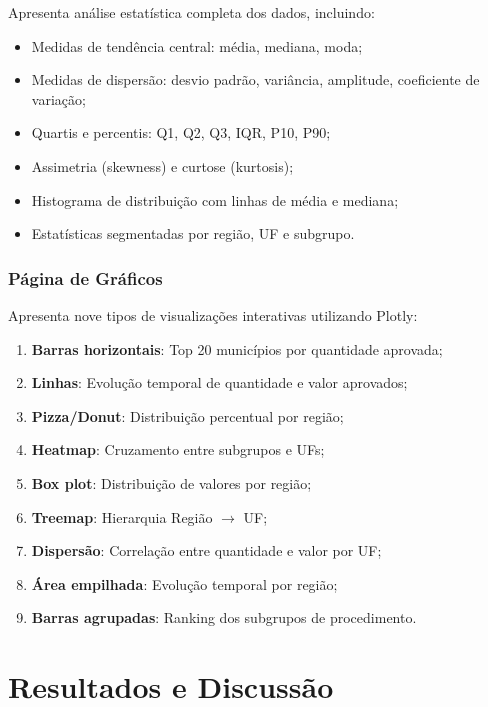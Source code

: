 \documentclass[
    12pt,
    oneside,
    a4paper,
    chapter=TITLE,
    section=TITLE
]{abntex2}
\begin{document}
Apresenta análise estatística completa dos dados, incluindo:

\begin{itemize}
    \item Medidas de tendência central: média, mediana, moda;
    \item Medidas de dispersão: desvio padrão, variância, amplitude, coeficiente de variação;
    \item Quartis e percentis: Q1, Q2, Q3, IQR, P10, P90;
    \item Assimetria (skewness) e curtose (kurtosis);
    \item Histograma de distribuição com linhas de média e mediana;
    \item Estatísticas segmentadas por região, UF e subgrupo.
\end{itemize}

\subsection{Página de Gráficos}

Apresenta nove tipos de visualizações interativas utilizando Plotly:

\begin{enumerate}
    \item \textbf{Barras horizontais}: Top 20 municípios por quantidade aprovada;
    \item \textbf{Linhas}: Evolução temporal de quantidade e valor aprovados;
    \item \textbf{Pizza/Donut}: Distribuição percentual por região;
    \item \textbf{Heatmap}: Cruzamento entre subgrupos e UFs;
    \item \textbf{Box plot}: Distribuição de valores por região;
    \item \textbf{Treemap}: Hierarquia Região $\rightarrow$ UF;
    \item \textbf{Dispersão}: Correlação entre quantidade e valor por UF;
    \item \textbf{Área empilhada}: Evolução temporal por região;
    \item \textbf{Barras agrupadas}: Ranking dos subgrupos de procedimento.
\end{enumerate}


\chapter{Resultados e Discussão}
\end{document}
